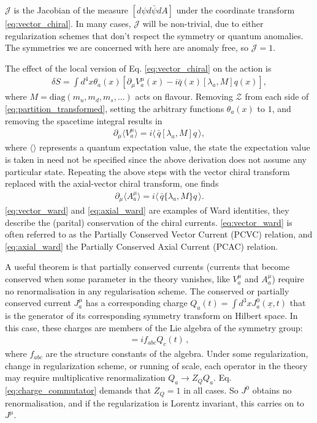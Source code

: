 $\mathcal{J}$ is the Jacobian of the measure $[d\psi d\bar{\psi} dA]$ under the coordinate transform \eqref{eq:vector_chiral}. In many cases, $\mathcal{J}$ will be non-trivial, due to either regularization schemes that don't respect the symmetry or quantum anomalies. The symmetries we are concerned with here are anomaly free, so $\mathcal{J}=1$.

The effect of the local version of Eq. \eqref{eq:vector_chiral} on the action is
\begin{align}
  \delta S = \int d^4x \theta_a(x) \left[ \partial_{\mu} V_a^{\mu}(x) - i\bar{q}(x) [\lambda_a,M] q(x) \right],
\end{align}
where $M = \text{diag}(m_u,m_d,m_s,...)$ acts on flavour. Removing $\mathcal{Z}$ from each side of \eqref{eq:partition_transformed}, setting the arbitrary functions $\theta_a(x)$ to $1$, and removing the spacetime integral results in
\begin{align}
  \partial_{\mu}\langle V_a^{\mu} \rangle = i \langle \, \bar{q} [ \lambda_a, M ] q \, \rangle,
  \label{eq:vector_ward}
\end{align}
where $\langle \rangle$ represents a quantum expectation value, the state the expectation value is taken in need not be specified since the above derivation does not assume any particular state. Repeating the above steps with the vector chiral transform replaced with the axial-vector chiral transform, one finds
\begin{align}
  \partial_{\mu}\langle A_a^{\mu} \rangle = i \langle\, \bar{q} \{ \lambda_a,M \} q \,\rangle.
  \label{eq:axial_ward}
\end{align}
\eqref{eq:vector_ward} and \eqref{eq:axial_ward} are examples of Ward identities, they describe the (parital) conservation of the chiral currents. \eqref{eq:vector_ward} is often referred to as the Partially Conserved Vector Current (PCVC) relation, and \eqref{eq:axial_ward} the Partially Conserved Axial Current (PCAC) relation.

A useful theorem \cite{Fubini:1964boa} is that partially conserved currents (currents that become conserved when some parameter in the theory vanishes, like $V^{\mu}_a$ and $A^{\mu}_a$) require no renormalisation in any regularisation scheme. %
The conserved or partially conserved current $J_a^{\mu}$ has a corresponding charge $Q_a(t) = \int d^3x J_a^{0}(\underline{x},t)$ that is the generator of its corresponding symmetry transform on Hilbert space. In this case, these charges are members of the Lie algebra of the symmetry group:
\begin{align}
  [ Q_a(t), Q_b(t) ] = if_{abc} Q_c(t)\,,
  \label{eq:charge_commutator}
\end{align}
where $f_{abc}$ are the structure constants of the algebra. Under some regularization, change in regularization scheme, or running of scale, each operator in the theory may require multiplicative renormalization $Q_a \to Z_Q Q_a$. Eq. \eqref{eq:charge_commutator} demands that $Z_Q=1$ in all cases. So $J^0$ obtains no renormalisation, and if the regularization is Lorentz invariant, this carries on to $J^{\mu}$.

